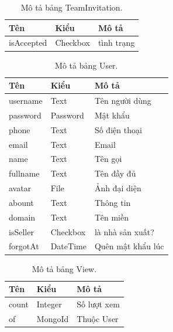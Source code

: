 \documentclass[11pt]{report}
\begin{document}
	
	\begin{table}[h!]
		\begin{center}
			\caption{Mô tả bảng TeamInvitation.}
			\begin{tabular}{ |l|l|l| } 
				\hline
				Tên & Kiểu & Mô tả \\
				\hline
				isAccepted & Checkbox & tình trạng \\
				\hline
			\end{tabular}
			\label{table:TeamInvitation}
		\end{center}
	\end{table}
	
	\begin{table}[h!]
		\begin{center}
			\caption{Mô tả bảng User.}
			\begin{tabular}{ |l|l|l| } 
				\hline
				Tên & Kiểu & Mô tả \\
				\hline
				username & Text & Tên người dùng \\
				password & Password & Mật khẩu \\
				phone & Text & Số điện thoại \\
				email & Text & Email \\
				name & Text & Tên gọi \\
				fullname & Text & Tên đầy đủ \\
				avatar & File & Ảnh đại diện \\
				abount & Text & Thông tin \\
				domain & Text & Tên miền \\
				isSeller & Checkbox & là nhà sản xuất? \\
				forgotAt & DateTime & Quên mật khẩu lúc \\ 
				\hline
			\end{tabular}
			\label{table:User}
		\end{center}
	\end{table}
	
	
	\begin{table}[h!]
		\begin{center}
			\caption{Mô tả bảng View.}
			\begin{tabular}{ |l|l|l| } 
				\hline
				Tên & Kiểu & Mô tả \\
				\hline
				count & Integer & Số lượt xem \\
				of & MongoId & Thuộc User \\ 
				\hline
			\end{tabular}
			\label{table:View}
		\end{center}
	\end{table}
	
\end{document}
